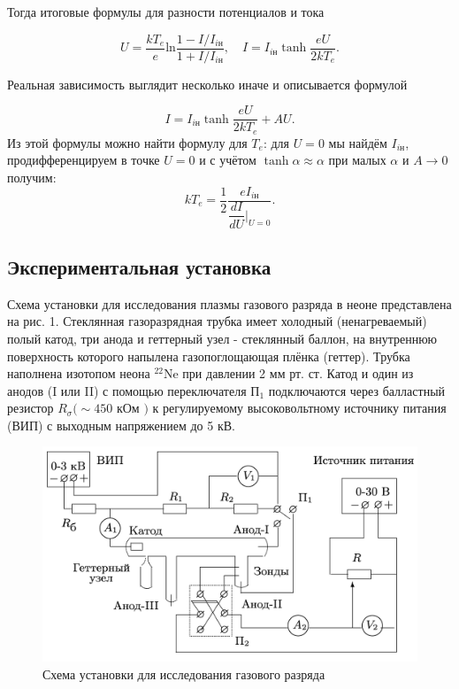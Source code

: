 \documentclass[12pt,a4paper]{article}
\begin{document}
Тогда итоговые формулы для разности потенциалов и тока

\begin{equation}
    U = \frac{kT_e}{e}\text{ln}\frac{1 - I/I_{iн}}{1 + I/I_{iн}}, \quad
    I = I_{iн} \tanh\dfrac{eU}{2kT_e}.
\end{equation}

Реальная зависимость выглядит несколько иначе и описывается формулой 

\begin{equation}
    I = I_{iн} \tanh\frac{eU}{2kT_e} + AU.
\end{equation}
Из этой формулы можно найти формулу для $T_e$: для $U=0$ мы найдём $I_{iн}$, продифференцируем в точке $U=0$ и с учётом $\tanh \alpha \approx \alpha$ при малых $\alpha$ и $A\rightarrow 0$ получим:
\begin{equation}
    kT_e = \dfrac{1}{2}\dfrac{eI_{iн}}{\dfrac{dI}{dU}|_{U=0}}.
\end{equation}

\subsection*{Экспериментальная установка}
Схема установки для исследования плазмы газового разряда в неоне представлена на рис. 1. 
Стеклянная газоразрядная трубка имеет холодный (ненагреваемый) полый катод, три анода и геттерный узел - стеклянный баллон, на внутреннюю поверхность которого напылена газопоглощающая плёнка (геттер). 
Трубка наполнена изотопом неона ${}^{22}$Ne при давлении 2 мм рт. ст. 
Катод и один из анодов (I или II) с помощью переключателя $П_1$ подключаются через балластный резистор $R_{\sigma}(\sim 450$ кОм $)$ к регулируемому высоковольтному источнику питания (ВИП) с выходным напряжением до 5 кВ.
\begin{figure}[H]
    \centering
    \includegraphics[width=0.7\linewidth]{scheme.png}
    \caption{Схема установки для исследования газового разряда}
\end{figure}
\end{document}
